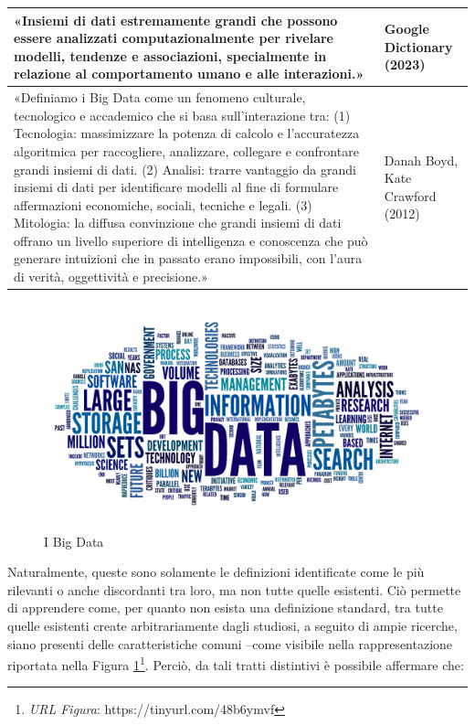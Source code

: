 \begin{longtable}{|p{11cm}|p{3cm}|}
    \hline
    «Insiemi di dati estremamente grandi che possono essere analizzati computazionalmente per rivelare modelli, tendenze e associazioni, specialmente in relazione al comportamento umano e alle interazioni.» 
    & Google Dictionary (2023) \cite{google_big_data}\\
    \hline
    «Definiamo i Big Data come un fenomeno culturale, tecnologico e accademico che si basa sull'interazione tra: (1) Tecnologia: massimizzare la potenza di calcolo e l'accuratezza algoritmica per raccogliere, analizzare, collegare e confrontare grandi insiemi di dati. (2) Analisi: trarre vantaggio da grandi insiemi di dati per identificare modelli al fine di formulare affermazioni economiche, sociali, tecniche e legali. (3) Mitologia: la diffusa convinzione che grandi insiemi di dati offrano un livello superiore di intelligenza e conoscenza che può generare intuizioni che in passato erano impossibili, con l'aura di verità, oggettività e precisione.» 
    & Danah Boyd, Kate Crawford (2012) \cite{routledge_big_data}\\
    \hline
\end{longtable}

\begin{figure}[H]
    \centering
    \includegraphics[width=0.8\linewidth]{figure/capitolo_2/Big_Data.pdf}
    \caption{I Big Data}
    \label{fig:Big_Data}
\end{figure}

Naturalmente, queste sono solamente le definizioni identificate come le più rilevanti o anche discordanti tra loro, ma non tutte quelle esistenti. Ciò permette di apprendere come, per quanto non esista una definizione standard, tra tutte quelle esistenti create arbitrariamente dagli studiosi, a seguito di ampie ricerche, siano presenti delle caratteristiche comuni --come visibile nella rappresentazione riportata nella Figura \ref{fig:Big_Data}\footnote{\textit{URL Figura}: https://tinyurl.com/48b6ymvf}. Perciò, da tali tratti distintivi è possibile affermare che:

